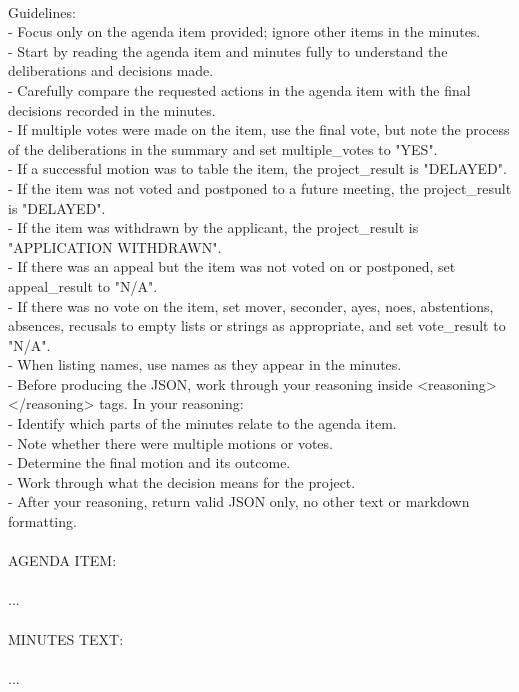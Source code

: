 \\ 
Guidelines:\\ 
- Focus only on the agenda item provided; ignore other items in the minutes.\\ 
- Start by reading the agenda item and minutes fully to understand the deliberations and decisions made.\\ 
- Carefully compare the requested actions in the agenda item with the final decisions recorded in the minutes.\\ 
- If multiple votes were made on the item, use the final vote, but note the process of the deliberations in the summary and set multiple_votes to "YES".\\ 
- If a successful motion was to table the item, the project_result is "DELAYED".\\ 
- If the item was not voted and postponed to a future meeting, the project_result is "DELAYED".\\ 
- If the item was withdrawn by the applicant, the project_result is "APPLICATION WITHDRAWN".\\ 
- If there was an appeal but the item was not voted on or postponed, set appeal_result to "N/A".\\ 
- If there was no vote on the item, set mover, seconder, ayes, noes, abstentions, absences, recusals to empty lists or strings as appropriate, and set vote_result to "N/A".\\ 
- When listing names, use names as they appear in the minutes.\\ 
- Before producing the JSON, work through your reasoning inside <reasoning></reasoning> tags. In your reasoning:\\ 
    - Identify which parts of the minutes relate to the agenda item.\\ 
    - Note whether there were multiple motions or votes.\\ 
    - Determine the final motion and its outcome.\\ 
    - Work through what the decision means for the project.\\ 
- After your reasoning, return valid JSON only, no other text or markdown formatting.\\ 
\\ 
AGENDA ITEM:\\ 
\\ 
...\\ 
\\ 
MINUTES TEXT:\\ 
\\ 
...